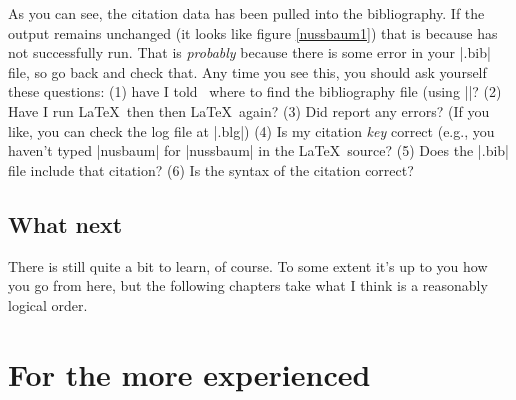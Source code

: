 As you can see, the citation data has been pulled into the
bibliography. If the output remains unchanged (it looks like figure
\ref{nussbaum1}) that is because  has not successfully
run. That is \emph{probably} because there is some error in your
|.bib| file, so go back and check that. Any time you see this, you
should ask yourself these
questions: (1) have I told \biblatex\ where
to find the bibliography file (using ||? (2) Have I
run \LaTeX\ then  then \LaTeX\ again? (3) Did
 report any errors? (If you like, you can check the log file at
|.blg|) (4) Is my citation \emph{key} correct (e.g.,
you haven't typed |nusbaum| for |nussbaum| in the \LaTeX\ source? (5)
Does the |.bib| file include that citation? (6) Is the syntax of the
citation correct?

\subsection{What next}

There is still quite a bit to learn, of course. To some extent it's up
to you how you go from here, but the following chapters take what I
think is a reasonably logical order.

\section{For the more experienced}
\label{expert}

